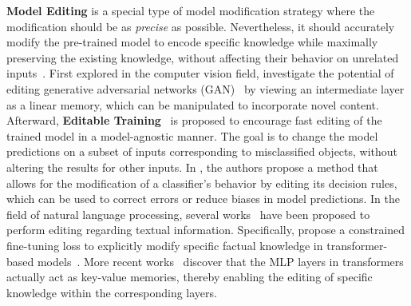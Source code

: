 \documentclass[acmsmall, screen]{acmart}
\begin{document}
\textbf{Model Editing} is a special type of model modification strategy where the modification should be as \textit{precise} as possible. Nevertheless, it should accurately modify the pre-trained model to encode specific knowledge while maximally preserving the existing knowledge, without affecting their behavior on unrelated inputs~\cite{ilharco2023editing}. 
First explored in the computer vision field, \citet{bau2020rewriting} investigate the potential of editing generative adversarial networks (GAN)~\cite{goodfellow2020generative} by viewing an intermediate layer as a linear memory, which can be manipulated to incorporate novel content. Afterward, \textbf{Editable Training}~\cite{sinitsin2020editable} is proposed to encourage fast editing of the trained model in a model-agnostic manner. The goal is to change the model predictions on a subset of inputs corresponding to misclassified objects, without altering the results for other inputs. 
In \cite{santurkar2021editing}, the authors propose a method that allows for the modification of a classifier's behavior by editing its decision rules, which can be used to correct errors or reduce biases in model predictions. In the field of natural language processing, several works~\cite{dai2022knowledge, SERAC} have been proposed to perform editing regarding textual information. Specifically, \citet{zhu2020modifying} propose a constrained fine-tuning loss to explicitly modify specific factual knowledge in transformer-based models~\cite{vaswani2017attention}.
More recent works~\cite{geva2021transformer,geva2022transformer} discover that the MLP layers in transformers actually act as key-value memories, thereby enabling the editing of specific knowledge within the corresponding layers. 
\end{document}
